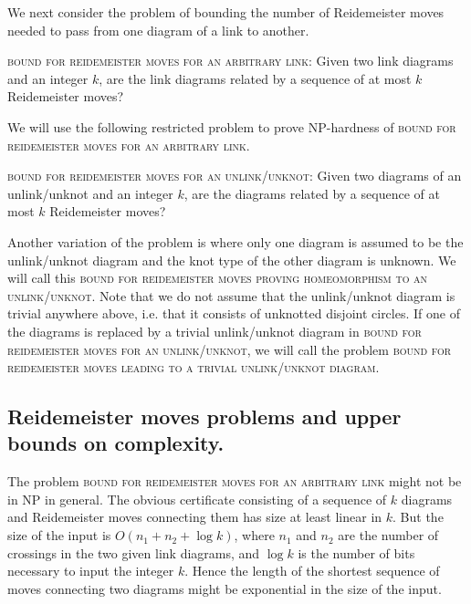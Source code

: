\documentclass[12pt]{amsart}
\theoremstyle{definition}
\theoremstyle{remark}
\begin{document}
We next consider the problem of bounding the number of Reidemeister moves needed to pass from one diagram of a link to another.

\vspace{0.14in}
\textsc{bound for reidemeister moves for an arbitrary link}: Given two link diagrams and an integer $k$, are the link diagrams related by a sequence of at most $k$ Reidemeister moves?
\vspace{0.14in}


 We will use the following restricted problem to prove NP-hardness of \textsc{bound for reidemeister moves for an arbitrary link}.


\vspace{0.14in}
\textsc{bound for reidemeister moves for an unlink/unknot}: Given two diagrams of an unlink/unknot and an integer $k$, are the diagrams related by a sequence of at most $k$ Reidemeister moves?
\vspace{0.14in}

Another variation of the problem is where only one diagram is assumed to be the unlink/unknot diagram and the knot type of the other diagram is unknown. We will call this \textsc{bound for reidemeister moves proving homeomorphism to an unlink/unknot}. Note that we do not assume that the unlink/unknot diagram is trivial anywhere above, i.e. that it consists of unknotted disjoint circles. If one of the diagrams is replaced by a trivial unlink/unknot diagram in \textsc{bound for reidemeister moves for an unlink/unknot}, we will call the problem \textsc{bound for reidemeister moves leading to a trivial unlink/unknot diagram}.


\subsection{Reidemeister moves problems and upper bounds on complexity.}

The problem \textsc{bound for reidemeister moves for an arbitrary link} might not be in NP in general. The obvious certificate consisting of a sequence of $k$ diagrams and Reidemeister moves connecting them has size at least linear in $k$. But the size of the input is $O(n_1+n_2+\log k)$, where $n_1$ and $n_2$ are the number of crossings in the two given link diagrams, and $\log k$ is the number of bits necessary to input the integer $k$. Hence the length of the shortest sequence of moves connecting two diagrams might be exponential in the size of the input.
\end{document}
